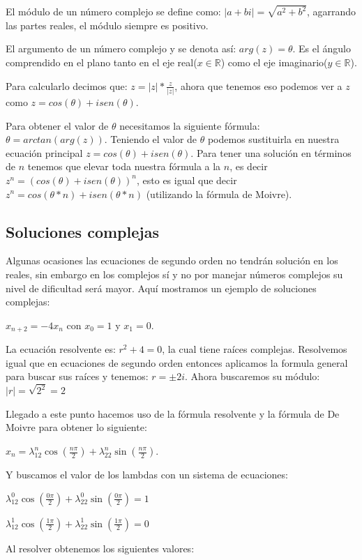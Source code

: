 \documentclass{article}
\begin{document}
El módulo de un número complejo se define como:
$|a+bi|=\sqrt{a^2+b^2}$, agarrando las partes reales, el módulo
siempre es positivo.

El argumento de un número complejo y se denota así:
$arg(z)=\theta$. Es el ángulo comprendido en el plano tanto en el eje
real($x\in\mathbb{R}$) como el eje imaginario($y\in\mathbb{R}$).

Para calcularlo decimos que:
$z=|z|*\frac{z}{|z|}$, ahora que tenemos eso podemos ver a $z$ como
$z=cos(\theta)+isen(\theta)$.

Para obtener el valor de $\theta$
necesitamos la siguiente fórmula: $\theta=arctan(arg(z))$. Teniendo el
valor de $\theta$ podemos sustituirla en nuestra ecuación principal
$z=cos(\theta)+isen(\theta)$. Para tener una solución en términos de
$n$ tenemos que elevar toda nuestra fórmula a la $n$, es decir
$z^n=(cos(\theta)+isen(\theta))^n$, esto es igual que decir
$z^n=cos(\theta*n)+isen(\theta*n)$ (utilizando la fórmula de Moivre).


\subsection{Soluciones complejas}
\label{sec:complejas}

Algunas ocasiones las ecuaciones de segundo orden no tendrán solución
en los reales, sin embargo en los complejos sí y no por manejar
números complejos su nivel de dificultad será mayor. Aquí mostramos un
ejemplo de soluciones complejas: 

$x_{n+2}=-4x_{n}$ con $x_0=1$ y $x_1=0$.

La ecuación resolvente es: $r^2+4=0$, la cual tiene raíces complejas.
Resolvemos igual que en ecuaciones de segundo orden entonces aplicamos
la formula general para buscar sus raíces y tenemos: $r=\pm2i$.
Ahora buscaremos su módulo: $|r|=\sqrt{2^2}=2$

Llegado a este punto hacemos uso de la fórmula resolvente y la fórmula de De Moivre para obtener lo siguiente:

$x_n=\lambda_12^n\cos(\frac{n\pi}{2})+\lambda_22^n\sin(\frac{n\pi}{2})$.

Y buscamos el valor de los lambdas con un sistema de ecuaciones:

$\lambda_12^0\cos(\frac{0\pi}{2})+\lambda_22^0\sin(\frac{0\pi}{2})=1$

$\lambda_12^1\cos(\frac{1\pi}{2})+\lambda_22^1\sin(\frac{1\pi}{2})=0$

Al resolver obtenemos los siguientes valores:
\end{document}
